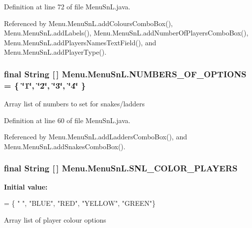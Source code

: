 Definition at line 72 of file Menu\+Sn\+L.\+java.



Referenced by Menu.\+Menu\+Sn\+L.\+add\+Colours\+Combo\+Box(), Menu.\+Menu\+Sn\+L.\+add\+Labels(), Menu.\+Menu\+Sn\+L.\+add\+Number\+Of\+Players\+Combo\+Box(), Menu.\+Menu\+Sn\+L.\+add\+Players\+Names\+Text\+Field(), and Menu.\+Menu\+Sn\+L.\+add\+Player\+Type().

\hypertarget{class_menu_1_1_menu_sn_l_aa0ead71ad043fc5f187fde721b34c34b}{}
\subsubsection[{N\+U\+M\+B\+E\+R\+S\+\_\+\+O\+F\+\_\+\+O\+P\+T\+I\+O\+N\+S}]{\setlength{\rightskip}{0pt plus 5cm}final String \mbox{[}$\,$\mbox{]} Menu.\+Menu\+Sn\+L.\+N\+U\+M\+B\+E\+R\+S\+\_\+\+O\+F\+\_\+\+O\+P\+T\+I\+O\+N\+S = \{ \char`\"{}1\char`\"{}, \char`\"{}2\char`\"{}, \char`\"{}3\char`\"{}, \char`\"{}4\char`\"{} \}\hspace{0.3cm}{\ttfamily [private]}}\label{class_menu_1_1_menu_sn_l_aa0ead71ad043fc5f187fde721b34c34b}
Array list of numbers to set for snakes/ladders 

Definition at line 60 of file Menu\+Sn\+L.\+java.



Referenced by Menu.\+Menu\+Sn\+L.\+add\+Ladders\+Combo\+Box(), and Menu.\+Menu\+Sn\+L.\+add\+Snakes\+Combo\+Box().

\hypertarget{class_menu_1_1_menu_sn_l_aa0aa3bcb48114b48faa0a49fa0c98504}{}
\subsubsection[{S\+N\+L\+\_\+\+C\+O\+L\+O\+R\+\_\+\+P\+L\+A\+Y\+E\+R\+S}]{\setlength{\rightskip}{0pt plus 5cm}final String \mbox{[}$\,$\mbox{]} Menu.\+Menu\+Sn\+L.\+S\+N\+L\+\_\+\+C\+O\+L\+O\+R\+\_\+\+P\+L\+A\+Y\+E\+R\+S\hspace{0.3cm}{\ttfamily [private]}}\label{class_menu_1_1_menu_sn_l_aa0aa3bcb48114b48faa0a49fa0c98504}
{\bfseries Initial value\+:}
\begin{DoxyCode}
= \{ \textcolor{stringliteral}{" "}, \textcolor{stringliteral}{"BLUE"}, \textcolor{stringliteral}{"RED"},
            \textcolor{stringliteral}{"YELLOW"}, \textcolor{stringliteral}{"GREEN"}\}
\end{DoxyCode}
Array list of player colour options 

